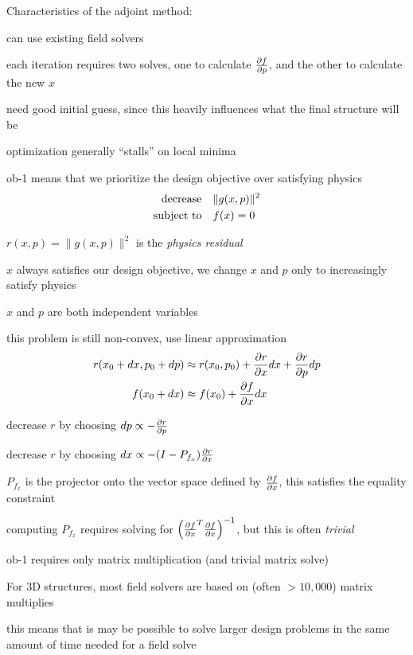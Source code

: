 \documentclass[landscape]{foils}
\renewcommand{\oursection}[1]{
\foilhead[-1.0cm]{#1}
}
\begin{document}
Characteristics of the adjoint method:
\BIT
\item can use existing field solvers 
\item each iteration requires two solves, one to calculate $\frac{\partial f}{\partial p}$, and the other to calculate the new $x$
\item need good initial guess, since this heavily influences what the final structure will be
\item optimization generally ``stalls'' on local minima
\EIT

\oursection{Objective-first approach}
ob-1 means that we prioritize the design objective over satisfying physics
\begin{align}
\mbox{decrease} & \quad \|g(x,p)\|^2 \\
\mbox{subject to} & \quad f(x) = 0
\end{align}
\BIT
\item $r(x,p) = \|g(x,p)\|^2$ is the \emph{physics residual}
\item $x$ always satisfies our design objective, we change $x$ and $p$ only to increasingly satisfy physics
\item $x$ and $p$ are both independent variables
\EIT
\newpage

\BIT
\item this problem is still non-convex, use linear approximation 
\begin{align}
r(x_0+dx,p_0+dp) & \approx r(x_0,p_0) + \frac{\partial r}{\partial x} dx + \frac{\partial r}{\partial p} dp \\
f(x_0+dx) & \approx f(x_0) + \frac{\partial f}{\partial x} dx 
\end{align}
\item decrease $r$ by choosing $dp \propto -\frac{\partial r}{\partial p}$
\item decrease $r$ by choosing 
    $dx \propto - (I - P_{f_x}) \frac{\partial r}{\partial x}$
\item $P_{f_x}$ is the projector onto the vector space defined by $\frac{\partial f}{\partial x}$, this satisfies the equality constraint
\item computing $P_{f_x}$ requires solving for $\left(\frac{\partial f}{\partial x}^T \frac{\partial f}{\partial x}\right)^{-1}$, but this is often \emph{trivial}
\EIT
\newpage


ob-1 requires only matrix multiplication (and trivial matrix solve)
\BIT
\item For 3D structures, most field solvers are based on (often $>10,000$) matrix multiplies
\item this means that is may be possible to solve larger design problems in the same amount of time needed for a field solve
\EIT
\end{document}
